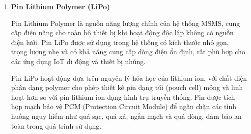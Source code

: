 \documentclass{article} %
\begin{document}
\begin{enumerate}[label=\alph*), leftmargin=1.5cm, itemsep=15pt]
\begin{itemize}
        \item \textbf{Quản lý chu kỳ sạc thông minh:} Khi dòng sạc giảm xuống 100mA sau khi đạt đến điện áp phao cuối cùng, chu kỳ sạc sẽ tự động kết thúc. Khi điện áp pin giảm dưới 4.1V, chu kỳ sạc lại sẽ tự động bắt đầu.
        
        \item \textbf{Bảo vệ pin điện áp thấp:} Khi điện áp pin thấp hơn 2.8V, pin sẽ được sạc trước với dòng điện 180mA để đảm bảo an toàn và kéo dài tuổi thọ pin.
        
        \item \textbf{Tích hợp cổng USB-A:} Vị trí hàn ổ cắm USB-A cái được cung cấp ở mặt sau của module, cho phép người dùng tự lắp đặt để có đầu ra USB-A tiêu chuẩn phục vụ các ứng dụng khác nhau.
        
        \item \textbf{Hiển thị trạng thái bằng LED:} Module tích hợp 4 đèn LED để hiển thị trạng thái nguồn, mức pin và trạng thái sạc/xả, giúp người dùng dễ dàng theo dõi tình trạng hệ thống.
    \end{itemize}

    Trong hệ thống MSMS, module IP5306 đóng vai trò là khối quản lý nguồn chính, đảm bảo hệ thống có thể hoạt động độc lập với pin lithium trong thời gian dài, đồng thời tự động sạc pin khi có nguồn ngoài và cung cấp nguồn ổn định 5V cho các thành phần khác trong hệ thống.

    \item {}
    \textbf{Pin Lithium Polymer (LiPo)}

    Pin Lithium Polymer là nguồn năng lượng chính của hệ thống MSMS, cung cấp điện năng cho toàn bộ thiết bị khi hoạt động độc lập không có nguồn điện lưới. Pin LiPo được sử dụng trong hệ thống có kích thước nhỏ gọn, trọng lượng nhẹ và có khả năng cung cấp dòng điện ổn định, rất phù hợp cho các ứng dụng IoT di động và thiết bị nhúng.

    Pin LiPo hoạt động dựa trên nguyên lý hóa học của lithium-ion, với chất điện phân dạng polymer cho phép thiết kế pin dạng túi (pouch cell) mỏng và linh hoạt hơn so với pin lithium-ion dạng hình trụ truyền thống. Pin được tích hợp mạch bảo vệ PCM (Protection Circuit Module) để ngăn chặn các tình huống nguy hiểm như quá sạc, quá xả, ngắn mạch và quá dòng, đảm bảo an toàn trong quá trình sử dụng.


\end{enumerate}
\end{document}
